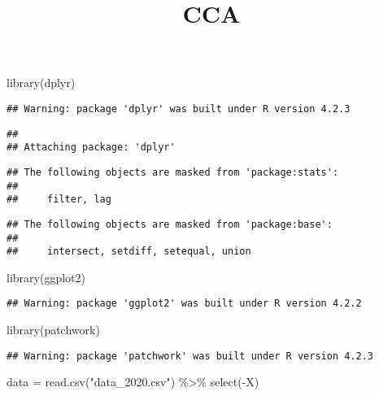\documentclass[
]{ctexart}
\title{CCA}
\author{}
\date{\vspace{-2.5em}}
\newenvironment{Shaded}{\begin{snugshade}}{\end{snugshade}}
\newcommand{\FunctionTok}[1]{\textcolor[rgb]{0.00,0.00,0.00}{#1}}
\newcommand{\NormalTok}[1]{#1}
\newcommand{\OtherTok}[1]{\textcolor[rgb]{0.56,0.35,0.01}{#1}}
\newcommand{\SpecialCharTok}[1]{\textcolor[rgb]{0.00,0.00,0.00}{#1}}
\newcommand{\StringTok}[1]{\textcolor[rgb]{0.31,0.60,0.02}{#1}}
\begin{document}
\maketitle

\begin{Shaded}
\begin{Highlighting}[]
\FunctionTok{library}\NormalTok{(dplyr)}
\end{Highlighting}
\end{Shaded}

\begin{verbatim}
## Warning: package 'dplyr' was built under R version 4.2.3
\end{verbatim}

\begin{verbatim}
## 
## Attaching package: 'dplyr'
\end{verbatim}

\begin{verbatim}
## The following objects are masked from 'package:stats':
## 
##     filter, lag
\end{verbatim}

\begin{verbatim}
## The following objects are masked from 'package:base':
## 
##     intersect, setdiff, setequal, union
\end{verbatim}

\begin{Shaded}
\begin{Highlighting}[]
\FunctionTok{library}\NormalTok{(ggplot2)}
\end{Highlighting}
\end{Shaded}

\begin{verbatim}
## Warning: package 'ggplot2' was built under R version 4.2.2
\end{verbatim}

\begin{Shaded}
\begin{Highlighting}[]
\FunctionTok{library}\NormalTok{(patchwork)}
\end{Highlighting}
\end{Shaded}

\begin{verbatim}
## Warning: package 'patchwork' was built under R version 4.2.3
\end{verbatim}

\begin{Shaded}
\begin{Highlighting}[]
\NormalTok{data }\OtherTok{=} \FunctionTok{read.csv}\NormalTok{(}\StringTok{"data\_2020.csv"}\NormalTok{) }\SpecialCharTok{\%\textgreater{}\%}
  \FunctionTok{select}\NormalTok{(}\SpecialCharTok{{-}}\NormalTok{X)}
\end{Highlighting}
\end{Shaded}
\end{document}
